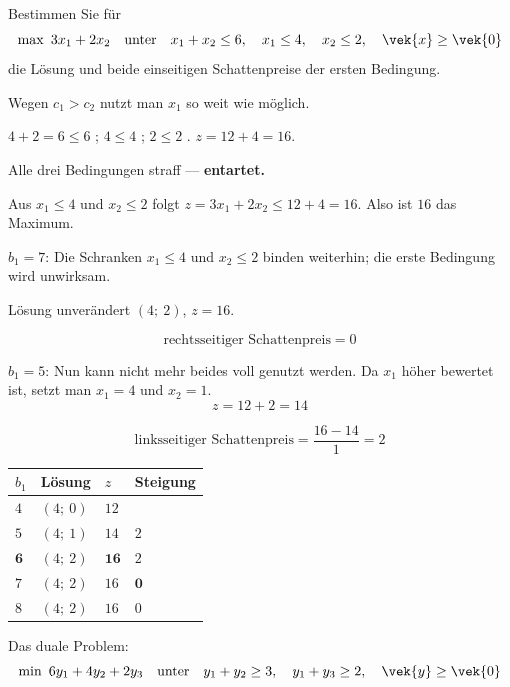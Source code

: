 \begin{aufgabe}
Bestimmen Sie für
\[ \max\ 3x_1+2x_2 \quad\text{unter}\quad x_1+x_2 \le 6,\quad x_1 \le 4,\quad x_2 \le 2,\quad \vek{x}\ge\vek{0} \]
die Lösung und beide einseitigen Schattenpreise der ersten Bedingung.

\loesung
{}
Wegen $c_1 > c_2$ nutzt man $x_1$ so weit wie möglich.

 $4+2 = 6 \le 6$ \checkmark; $4 \le 4$ \checkmark; $2 \le 2$ \checkmark. $z = 12+4 = 16$.

Alle drei Bedingungen straff --- \textbf{entartet.}

Aus $x_1 \le 4$ und $x_2 \le 2$ folgt $z = 3x_1+2x_2 \le 12+4 = 16$. Also ist $16$ das Maximum. \checkmark

$b_1 = 7$: Die Schranken $x_1 \le 4$ und $x_2 \le 2$ binden weiterhin; die erste Bedingung wird unwirksam.

Lösung unverändert $(4;\ 2)$, $z = 16$.

\[ \text{rechtsseitiger Schattenpreis} = 0 \]

$b_1 = 5$: Nun kann nicht mehr beides voll genutzt werden. Da $x_1$ höher bewertet ist, setzt man $x_1 = 4$ und $x_2 = 1$.
\[ z = 12+2 = 14 \]

\[ \text{linksseitiger Schattenpreis} = \frac{16-14}{1} = 2 \]

\begin{center}
\renewcommand{\arraystretch}{1.46}
\begin{tabular}{@{}P{1.6cm}P{2.2cm}P{1.6cm}P{2.2cm}@{}}
\toprule
$b_1$ & \textbf{Lösung} & $z$ & \textbf{Steigung}\\
\midrule
$4$ & $(4;\ 0)$ & $12$ & \\
$5$ & $(4;\ 1)$ & $14$ & $2$\\
$\mathbf{6}$ & $(4;\ 2)$ & $\mathbf{16}$ & $2$\\
$7$ & $(4;\ 2)$ & $16$ & $\mathbf{0}$\\
$8$ & $(4;\ 2)$ & $16$ & $0$\\
\bottomrule
\end{tabular}
\end{center}

Das duale Problem:
\[ \min\ 6y_1+4y_2+2y_3 \quad\text{unter}\quad y_1+y_2 \ge 3,\quad y_1+y_3 \ge 2,\quad \vek{y}\ge\vek{0} \]


\end{aufgabe}

